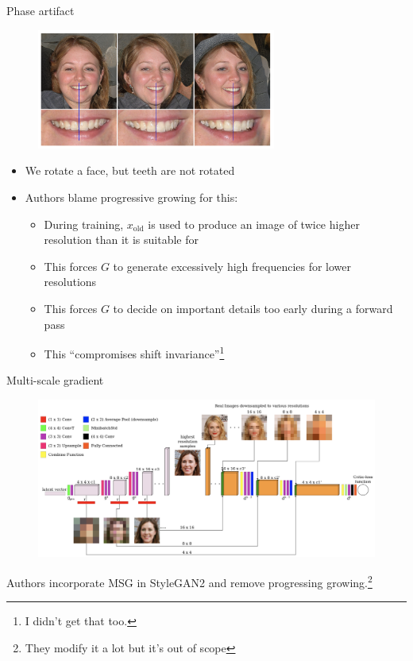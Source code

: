 \documentclass[handout, 10pt]{beamer}
\begin{document}
\begin{frame}{Phase artifact}
\begin{figure}
\centering
\includegraphics[width=0.7\textwidth]{images/phase-artifact}
\end{figure}
\begin{itemize}\small
    \item\pause We rotate a face, but teeth are not rotated
    \item\pause Authors blame progressive growing for this:
    \begin{itemize}
        \item\pause During training, $x_\text{old}$ is used to produce an image of twice higher resolution than it is suitable for
        \item\pause This forces $G$ to generate excessively high frequencies for lower resolutions
        \item\pause This forces $G$ to decide on important details too early during a forward pass
        \item\pause This ``compromises shift invariance''\footnote{I didn't get that too.}
    \end{itemize}
\end{itemize}
\end{frame}

\begin{frame}{Multi-scale gradient}
\begin{figure}
\centering
\includegraphics[width=\textwidth]{images/msg}
\end{figure}

Authors incorporate MSG in StyleGAN2 and remove progressing growing.\footnote{They modify it a lot but it's out of scope}
\end{frame}
\end{document}
